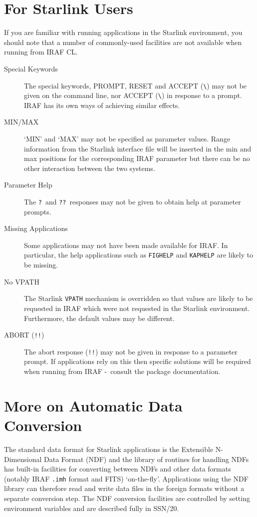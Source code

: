 \documentclass[twoside,11pt]{article}
\newcommand{\xref}[3]{#1}
\newcommand{\xlabel}[1]{}
\newcommand{\dash}{--}
\renewcommand{\dash}{-}
\begin{document}
\section{\xlabel{for_starlink_users}For Starlink Users}
If you are familiar with running applications in the Starlink environment, you
should note that a number of commonly-used facilities are not available when
running from IRAF CL.
\begin{description}
\item[Special Keywords] The special keywords, PROMPT, RESET and ACCEPT
(\verb!\!) may not be given on the command line, nor ACCEPT (\verb!\!) in
response to a prompt.
IRAF has its own ways of achieving similar effects.
\item[MIN/MAX] `MIN' and `MAX' may not be specified as parameter values.
Range information from the Starlink interface file will be inserted in the
min and max positions for the corresponding IRAF parameter but there can be
no other interaction between the two systems.
\item[Parameter Help] The \texttt{?}\ and \texttt{??}\ responses may not be
given to obtain help at parameter prompts.
\item[Missing Applications] Some applications may not have been made available
for IRAF. In particular, the help applications such as \texttt{FIGHELP} and
\texttt{KAPHELP} are likely to be missing.
\item[No VPATH] The Starlink \texttt{VPATH} mechanism is overridden so that
values are likely to be requested in IRAF which were not requested in the
Starlink environment. Furthermore, the default values may be different.
\item[ABORT ({\texttt{!!}})] The abort response ({\texttt{!!}}) may not be
given in response to a parameter prompt.
If applications rely on this then specific solutions will be required when
running from IRAF \dash\ consult the package documentation.
\end{description}

\section{\xlabel{more_on_automatic_data_conversion}\label{more_on_automatic_data_conversion}More on Automatic Data Conversion}
The standard data format for Starlink applications is the
\xref{Extensible N-Dimensional Data Format (NDF)}{sun33}{}
and the library of routines for handling NDFs has built-in facilities for
converting between NDFs and other data formats (notably IRAF \texttt{.imh}
format and FITS) `on-the-fly'.
Applications using the NDF library can therefore read and write data files in
the foreign formats without a separate conversion step.
The NDF conversion facilities are controlled by setting environment variables
and are described fully in \xref{SSN/20}{ssn20}{}.
\end{document}
